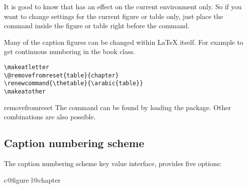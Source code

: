 It is good to know that  has an effect on the current environment only.
So if you want to change settings for the current figure or table only, just place the
 command inside the figure or table right before the 
command.


Many of the caption figures can be changed within LaTeX itself. For example to get continuous numbering in the book class.

\begin{tcolorbox}
\begin{lstlisting}
\makeatletter
\@removefromreset{table}{chapter}
\renewcommand{\thetable}{\arabic{table}}
\makeatother
\end{lstlisting}
\end{tcolorbox}

\begin{macro}{removefromreset}
The command  can be found by loading the  package. Other combinations are also possible.
\end{macro}

\subsection{Caption numbering scheme}

The caption numbering scheme key value interface, provides five
options: 
\medskip



%

\def\@removefromreset#1#2{\let\@tempb\@elt
   \expandafter\let\expandafter\@tempa\csname c@#1\endcsname
   \def\@elt##1{\expandafter\ifx\csname c@##1\endcsname\@tempa\else
         \noexpand\@elt{##1}\fi}%
   \expandafter\edef\csname cl@#2\endcsname{\csname cl@#2\endcsname}%
   \let\@elt\@tempb}

\@removefromreset{figure}{chapter}
\renewcommand{\thefigure}{\arabic{figure}}

\@specialfalse\@tocfalse


